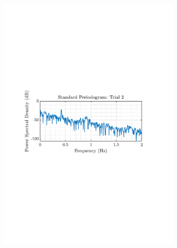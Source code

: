 \documentclass[12pt]{article}
\begin{document}
\begin{figure}[H]
\begin{subfigure}{0.49\textwidth}
			\includegraphics[trim={2.2cm 11cm 3.15cm  11.2cm}, clip, width=\textwidth]{../MATLAB/figures/q1_5a_fig02.pdf} 
		\end{subfigure}
		\begin{subfigure}{0.49\textwidth}
			\centering

\end{subfigure}
\end{figure}
\end{document}
